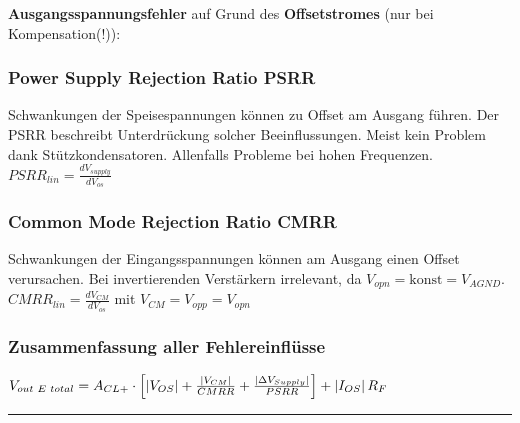 			\begin{minipage}{18cm}
            	\vspace{3mm}
				\textbf{Ausgangsspannungsfehler} auf Grund des \textbf{Offsetstromes} (nur bei
				Kompensation(!)):
				\\
			\end{minipage}

		\subsubsection{Power Supply Rejection Ratio PSRR}
		Schwankungen der Speisespannungen können zu Offset am Ausgang führen.
		Der PSRR beschreibt Unterdrückung solcher Beeinflussungen. 
		Meist kein Problem dank Stützkondensatoren. 
		Allenfalls Probleme bei hohen Frequenzen. \\
		$PSRR_{lin}=\frac{dV_{supply}}{dV_{os}}$  \\
		
		
		\subsubsection{Common Mode Rejection Ratio CMRR}
		Schwankungen der Eingangsspannungen können am Ausgang einen Offset verursachen. 
		Bei invertierenden Verstärkern irrelevant, da $V_{opn}=\text{konst}=V_{AGND}$. \\
		$CMRR_{lin}=\frac{dV_{CM}}{dV_{os}}$ mit $V_{CM}=V_{opp}=V_{opn}$ \\

		\subsubsection{Zusammenfassung aller Fehlereinflüsse}
      $V_{out\hspace{1mm}E\hspace{1mm}total}=A_{CL+}\cdot\left[\left|V_{OS}\right|+\frac{\left|V_{CM}\right|}{CMRR}
            	+\frac{\left|\Delta V_{Supply}\right|}{PSRR}\right]+\left|I_{OS}\right|R_F$\\
\hrule
